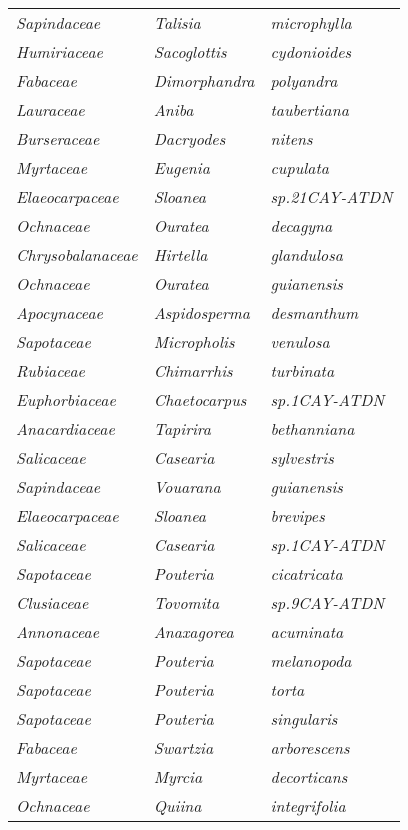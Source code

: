 \documentclass[fleqn,10pt]{ArtEcoFoG} %
\renewenvironment{table}{\begin{table*}}{\end{table*}\ignorespacesafterend}
\begin{document}
\begin{table}
\begin{tabular}[t]{lll}
\em{Sapindaceae} & \em{Talisia} & \em{microphylla}\\
\em{Humiriaceae} & \em{Sacoglottis} & \em{cydonioides}\\
\em{Fabaceae} & \em{Dimorphandra} & \em{polyandra}\\
\em{Lauraceae} & \em{Aniba} & \em{taubertiana}\\
\addlinespace
\em{Burseraceae} & \em{Dacryodes} & \em{nitens}\\
\em{Myrtaceae} & \em{Eugenia} & \em{cupulata}\\
\em{Elaeocarpaceae} & \em{Sloanea} & \em{sp.21CAY-ATDN}\\
\em{Ochnaceae} & \em{Ouratea} & \em{decagyna}\\
\em{Chrysobalanaceae} & \em{Hirtella} & \em{glandulosa}\\
\addlinespace
\em{Ochnaceae} & \em{Ouratea} & \em{guianensis}\\
\em{Apocynaceae} & \em{Aspidosperma} & \em{desmanthum}\\
\em{Sapotaceae} & \em{Micropholis} & \em{venulosa}\\
\em{Rubiaceae} & \em{Chimarrhis} & \em{turbinata}\\
\em{Euphorbiaceae} & \em{Chaetocarpus} & \em{sp.1CAY-ATDN}\\
\addlinespace
\em{Anacardiaceae} & \em{Tapirira} & \em{bethanniana}\\
\em{Salicaceae} & \em{Casearia} & \em{sylvestris}\\
\em{Sapindaceae} & \em{Vouarana} & \em{guianensis}\\
\em{Elaeocarpaceae} & \em{Sloanea} & \em{brevipes}\\
\em{Salicaceae} & \em{Casearia} & \em{sp.1CAY-ATDN}\\
\addlinespace
\em{Sapotaceae} & \em{Pouteria} & \em{cicatricata}\\
\em{Clusiaceae} & \em{Tovomita} & \em{sp.9CAY-ATDN}\\
\em{Annonaceae} & \em{Anaxagorea} & \em{acuminata}\\
\em{Sapotaceae} & \em{Pouteria} & \em{melanopoda}\\
\em{Sapotaceae} & \em{Pouteria} & \em{torta}\\
\addlinespace
\em{Sapotaceae} & \em{Pouteria} & \em{singularis}\\
\em{Fabaceae} & \em{Swartzia} & \em{arborescens}\\
\em{Myrtaceae} & \em{Myrcia} & \em{decorticans}\\
\em{Ochnaceae} & \em{Quiina} & \em{integrifolia}\\

\end{tabular}
\end{table}
\end{document}
